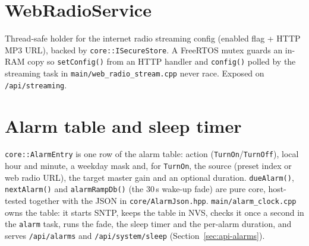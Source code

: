 \section{WebRadioService}\label{cls:WebRadioService}
Thread-safe holder for the internet radio streaming config (enabled flag +
HTTP MP3 URL), backed by \texttt{core::ISecureStore}. A FreeRTOS mutex
guards an in-RAM copy so \texttt{setConfig()} from an HTTP handler and
\texttt{config()} polled by the streaming task in
\texttt{main/web\_radio\_stream.cpp} never race. Exposed on
\texttt{/api/streaming}.

\section{Alarm table and sleep timer}\label{sec:alarm-clock}
\texttt{core::AlarmEntry} is one row of the alarm table: action
(\texttt{TurnOn}/\texttt{TurnOff}), local hour and minute, a weekday mask
and, for \texttt{TurnOn}, the source (preset index or web radio URL), the
target master gain and an optional duration. \texttt{dueAlarm()},
\texttt{nextAlarm()} and \texttt{alarmRampDb()} (the 30\,s wake-up fade)
are pure core, host-tested together with the JSON in
\texttt{core/AlarmJson.hpp}. \texttt{main/alarm\_clock.cpp} owns the
table: it starts SNTP, keeps the table in NVS, checks it once a second in
the \texttt{alarm} task, runs the fade, the sleep timer and the per-alarm
duration, and serves \texttt{/api/alarms} and \texttt{/api/system/sleep}
(Section~\ref{sec:api-alarms}).

